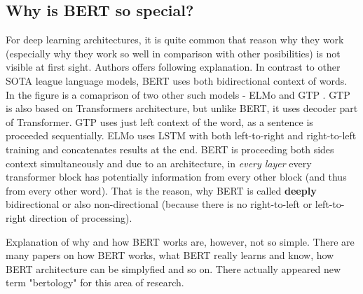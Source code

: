  \subsection{Why is BERT so special?}
 \label{sub:specialBert}
For deep learning architectures, it is quite common that reason why they work (especially why they work so well in comparison with other posibilities) is not visible at first sight. Authors offers following explanation. In contrast to other SOTA league language models, BERT uses both bidirectional context of words. In the figure %
is a comaprison of two other such models - ELMo and GTP %
. GTP is also based on Transformers architecture, but unlike BERT, it uses decoder part of Transformer. 
GTP uses just left context of the word, as a sentence is proceeded sequentially. ELMo uses LSTM %
with both left-to-right and right-to-left training and concatenates results at the end. BERT is proceeding both sides context simultaneously and due to an architecture, in \textit{every layer} every transformer block has potentially information from every other block (and thus from every other word). That is the reason, why BERT is called \textbf{deeply} bidirectional or also non-directional (because there is no right-to-left or left-to-right direction of processing).
\par
Explanation of why and how BERT works are, however, not so simple. There are many papers on how BERT works, what BERT really learns and know, how BERT architecture can be simplyfied and so on. There actually appeared new term "bertology" for this area of research.
 

